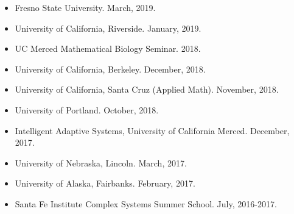 \documentclass[margin,line,12pt]{res}
\begin{document}
\begin{resume}
\begin{itemize}
\item Fresno State University. March, 2019.

\item University of California, Riverside. January, 2019.

\item UC Merced Mathematical Biology Seminar. 2018.

\item University of California, Berkeley. December, 2018.

\item University of California, Santa Cruz (Applied Math). November, 2018.

\item University of Portland. October, 2018.

\item Intelligent Adaptive Systems, University of California Merced. December, 2017.

\item University of Nebraska, Lincoln. March, 2017.

\item University of Alaska, Fairbanks. February, 2017.

\item Santa Fe Institute Complex Systems Summer School. July, 2016-2017.


\end{itemize}
\end{resume}
\end{document}
